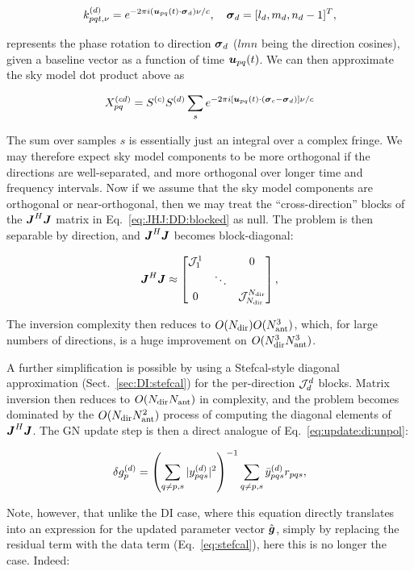 \documentclass[useAMS,usenatbib]{mn2e}
\newcommand{\mat}[1]{{\bmath{#1}}}
\newcommand{\JJ}{\mat{J}} %
\newcommand{\JHJ}{\JJ^H\JJ} %
\begin{document}
\[
k^{(d)}_{pqt,\nu} = e^{-2\pi i (\bmath{u}_{pq}(t)\cdot\bmath{\sigma}_d)\nu/c},~~~\bmath{\sigma}_d = [l_d,m_d,n_d-1]^T,
\]

represents the phase rotation to direction $\bmath{\sigma}_d$ ($lmn$ being the direction cosines), given a 
baseline vector as a function of time $\bmath{u}_{pq}(t)$. We can then approximate the sky model dot product above as

\[
X_{pq}^{(cd)} = S^{(c)}S^{(d)} \sum_s e^{-2\pi i [\bmath{u}_{pq}(t)\cdot(\bmath{\sigma}_c-\bmath{\sigma}_d) ]\nu/c}
\]

The sum over samples $s$ is essentially just an integral over a complex fringe. We may therefore expect sky model 
components to be more orthogonal if the directions are well-separated, and more orthogonal over longer time and
frequency intervals. Now if we assume that the sky model components are orthogonal or near-orthogonal, then
we may treat the ``cross-direction'' blocks of the $\JHJ$ matrix in Eq.~\ref{eq:JHJ:DD:blocked} as null. The problem is 
then separable by direction, and $\JHJ$ becomes block-diagonal:


\begin{equation}
\label{eq:JHJ:DD:block-diag}
\JHJ \approx \Matrix{ccc}{\JJJ^1_1 &  & 0 \\
& \ddots &  \\
0 & & \JJJ_{\Nd}^{\Nd} },
\end{equation}


The inversion complexity then reduces to $O(N_\mathrm{dir})O(N_\mathrm{ant}^3)$, which, for large numbers of directions, is a huge improvement on $O(N_\mathrm{dir}^3N_\mathrm{ant}^3)$. 

A further simplification is possible by using a Stefcal-style diagonal approximation (Sect.~\ref{sec:DI:stefcal}) for
the per-direction $\mathcal{J}^d_d$ blocks. Matrix inversion then reduces to $O(N_\mathrm{dir}N_\mathrm{ant})$ in complexity, and the problem becomes dominated by
the $O(N_\mathrm{dir}N_\mathrm{ant}^2)$ process of computing the diagonal elements of $\JHJ$. The GN update step is then a direct analogue of
Eq.~\ref{eq:update:di:unpol}:

\begin{equation}
\label{eq:update:dd:unpol}
\delta g^{(d)}_p = \left( \sum\limits_{q\ne p,s} |y^{(d)}_{pqs}|^2  \right )^{-1} \sum\limits_{q\ne p,s} \bar{y}^{(d)}_{pqs} r_{pqs},
\end{equation}

Note, however, that unlike the DI case, where this equation directly translates into
an expression for the updated parameter vector $\hat{\bmath{g}}$, simply by replacing the residual term with the data 
term (Eq.~\ref{eq:stefcal}), here this is no longer the case. Indeed:
\end{document}
